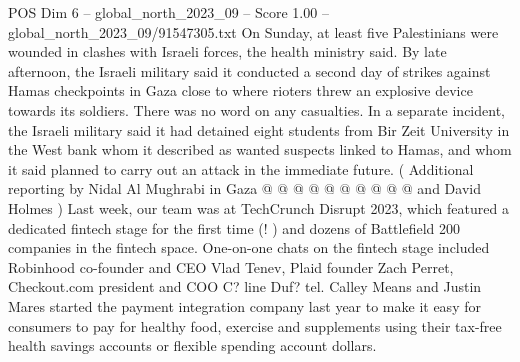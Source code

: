 \begin{textsample}{POS Dim 6 – global\_north\_2023\_09 – Score 1.00 – global\_north\_2023\_09/91547305.txt}
On Sunday, at least five Palestinians were wounded in clashes with Israeli forces, the health ministry said.
By late afternoon, the Israeli military said it conducted a second day of strikes against Hamas checkpoints in Gaza close to where rioters threw an explosive device towards its soldiers.
There was no word on any casualties.
In a separate incident, the Israeli military said it had detained eight students from Bir Zeit University in the West bank whom it described as wanted suspects linked to Hamas, and whom it said planned to carry out an attack in the immediate future. ( Additional reporting by Nidal Al Mughrabi in Gaza @ @ @ @ @ @ @ @ @ @ and David Holmes ) Last week, our team was at TechCrunch Disrupt 2023, which featured a dedicated fintech stage for the first time (! ) and dozens of Battlefield 200 companies in the fintech space.
One-on-one chats on the fintech stage included Robinhood co-founder and CEO Vlad Tenev, Plaid founder Zach Perret, Checkout.com president and COO C? line Duf? tel.
Calley Means and Justin Mares started the payment integration company last year to make it easy for consumers to pay for healthy food, exercise and supplements using their tax-free health savings accounts or flexible spending account dollars.

\end{textsample}
